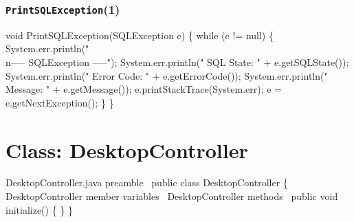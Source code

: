 \subsection{\texttt{PrintSQLException}(1)}
\nwenddocs{}\endmoddef{}
void PrintSQLException(SQLException e) \{
  while (e != null) \{
    System.err.println("\\n----- SQLException -----");
    System.err.println("  SQL State:  " + e.getSQLState());
    System.err.println("  Error Code: " + e.getErrorCode());
    System.err.println("  Message:    " + e.getMessage());
    e.printStackTrace(System.err);
    e = e.getNextException();
  \}
\}
\eatline
{}\nwendcode{}\nwdocspar
\nwenddocs{}\chapter{Class: DesktopController}
\label{deskcon}

\nwenddocs{}\endmoddef{}
\LA{}DesktopController.java preamble~{\nwtagstyle{}}\RA{}
public class DesktopController \{
  \LA{}\code{}DesktopController\edoc{} member variables~{\nwtagstyle{}}\RA{}
  \LA{}\code{}DesktopController\edoc{} methods~{\nwtagstyle{}}\RA{}
  public void initialize() \{ \}
\}
\nwendcode{}\nwdocspar

